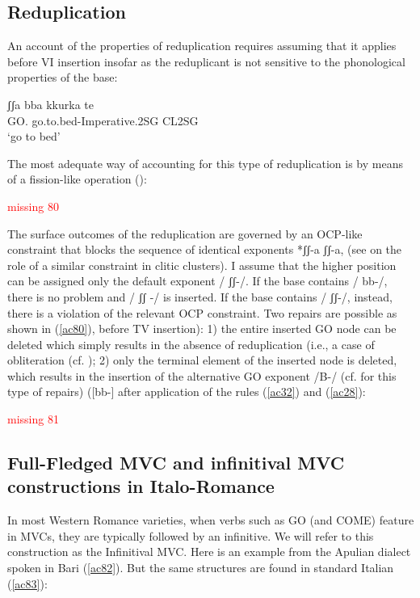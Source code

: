 \documentclass[output=paper]{langscibook}
\begin{document}
\subsection{Reduplication}

An account of the properties of reduplication requires assuming that it applies before VI insertion insofar as the reduplicant is not sensitive to the phonological properties of the base:

\ea \label{ac79}\gll ʃʃa  bba  kkurka te\\
    GO. go.to.bed-Imperative.2SG CL2SG\\
   \glt ‘go to bed’
\z

The most adequate way of accounting for this type of reduplication is by means of a fission-like operation (\cite{calabrese1988a, noyer1992a, arregi2012a, calabrese2014a}): 


\ea\label{ac80}
\textcolor{red}{missing 80}
\z

The surface outcomes of the reduplication are governed by an OCP-like constraint that blocks the sequence of identical exponents *ʃʃ-a ʃʃ-a, (see \cite{pescarini2010a} on the role of a similar constraint in clitic clusters).  I assume that the higher position can be assigned only the default exponent / ʃʃ-/. If the base contains / bb-/, there is no problem and / ʃʃ -/ is inserted.  If the base contains / ʃʃ-/, instead, there is a violation of the relevant OCP constraint.  Two repairs are possible as shown in (\ref{ac80}), before TV insertion): 1) the entire inserted GO node can be deleted which simply results in the absence of reduplication (i.e., a case of obliteration (cf. \cite{arregi2012a}); 2) only the terminal element of the inserted node is deleted, which results in the insertion of the alternative GO exponent /B-/ (cf. \cite{pescarini2010a} for this type of repairs) ([bb-] after application of the rules (\ref{ac32}) and (\ref{ac28}):


\ea
\textcolor{red}{missing 81}
\z

\subsection{Full-Fledged MVC and infinitival MVC constructions in Italo-Romance}

In most Western Romance varieties, when verbs such as GO (and COME) feature in MVCs, they are typically followed by an infinitive. We will refer to this construction as the Infinitival MVC. Here is an example from the Apulian dialect spoken in Bari (\ref{ac82}).  But the same structures are found in standard Italian (\ref{ac83}): 
\end{document}
